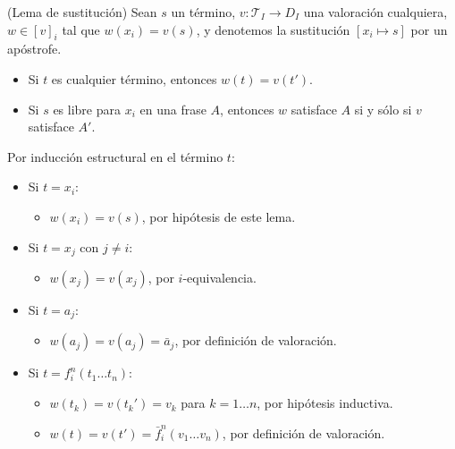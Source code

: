 \begin{proposition}
(Lema de sustitución) Sean $s$ un término, $v : \mathscr T_I \to D_I$ una valoración cualquiera, $w \in [v]_i$ tal que $w(x_i) = v(s)$, y denotemos la sustitución $[x_i \mapsto s]$ por un apóstrofe.

\begin{itemize}
    \item Si $t$ es cualquier término, entonces $w(t) = v(t')$.
    \item Si $s$ es libre para $x_i$ en una frase $A$, entonces $w$ satisface $A$ si y sólo si $v$ satisface $A'$.
\end{itemize}
\end{proposition}

\begin{prove}
Por inducción estructural en el término $t$:

\begin{itemize}
    \item Si $t = x_i$:
    \begin{itemize}
        \item $w(x_i) = v(s)$, por hipótesis de este lema.
    \end{itemize}
    
    \item Si $t = x_j$ con $j \ne i$:
    \begin{itemize}
        \item $w(x_j) = v(x_j)$, por $i$-equivalencia.
    \end{itemize}
    
    \item Si $t = a_j$:
    \begin{itemize}
        \item $w(a_j) = v(a_j) = \bar a_j$, por definición de valoración.
    \end{itemize}
    
    \item Si $t = f_i^n(t_1 \dots t_n)$:
    \begin{itemize}
        \item $w(t_k) = v(t_k') = v_k$ para $k = 1 \dots n$, por hipótesis inductiva.
        \item $w(t) = v(t') = \bar f_i^n(v_1 \dots v_n)$, por definición de valoración.
    \end{itemize}
\end{itemize}
\end{prove}

